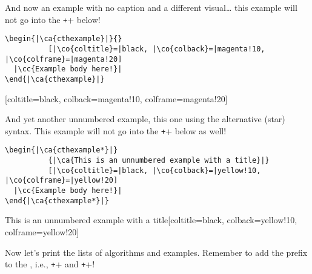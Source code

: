 \documentclass{article}
\begin{document}
And now an example with no caption and a different visual…  this example will not go into the \texttt+\listofexamples+ below!

\begin{verbatim}
\begin{|\ca{cthexample}|}{}
          [|\co{coltitle}=|black, |\co{colback}=|magenta!10, |\co{colframe}=|magenta!20]
  |\cc{Example body here!}|
\end{|\ca{cthexample}|}
\end{verbatim}

\begin{cthexample}{}[coltitle=black, colback=magenta!10, colframe=magenta!20]
  \emph{\kant[4]}
\end{cthexample}

And yet another unnumbered example, this one using the alternative (star) syntax. This example will not go into the \texttt+\listofexamples+ below as well!

\begin{verbatim}
\begin{|\ca{cthexample*}|}
          {|\ca{This is an unnumbered example with a title}|}
          [|\co{coltitle}=|black, |\co{colback}=|yellow!10, |\co{colframe}=|yellow!20]
  |\cc{Example body here!}|
\end{|\ca{cthexample*}|}
\end{verbatim}

\begin{cthexample*}{This is an unnumbered example with a title}[coltitle=black, colback=yellow!10, colframe=yellow!20]
  \emph{\kant[4]}
\end{cthexample*}

Now let's print the lists of algorithms and examples. Remember to add the prefix  to the , i.e., \texttt+\cthlistofalgorithms+ and \texttt+\cthlistofexamples+!

\cthlistofalgorithms

\cthlistofexamples
\end{document}
